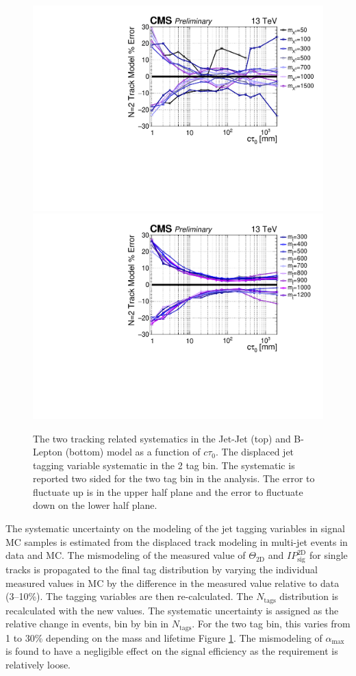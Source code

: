 \begin{figure}
\begin{center}
\includegraphics[width=.70\textwidth]{figures/an/SYSTEMATICS/76x_pu/sys_2tag_tracking.pdf}
\includegraphics[width=.70\textwidth]{figures/an/SYSTEMATICS/76x_pu/sys_2tag_tracking_dsusy.pdf}
\caption{The two tracking related systematics in the Jet-Jet (top) and B-Lepton
 (bottom)  model as a function of $c\tau_0$.  The displaced jet tagging variable 
systematic in the 2 tag bin. The systematic is reported two sided for the two tag
 bin in the analysis. The error to fluctuate up is in the upper half plane and the
 error to fluctuate down on the lower half plane.  \label{fig:offline_tracking_sys}}
\end{center}
\end{figure}

The systematic uncertainty on the modeling of the jet tagging
variables in signal MC samples is estimated from the displaced track
modeling in multi-jet events in data and MC. The mismodeling of the
measured value of $\Theta_{\textrm{2D}}$ and $IP_{\textrm{sig}}^{\textrm{2D}}$ for
single tracks is propagated to the final tag distribution by varying
the individual measured values in MC by the difference in the measured
value relative to data (3--10\%). The tagging variables are then
re-calculated.  The $N_{\textrm{tags}}$ distribution is recalculated
with the new values. The systematic uncertainty is assigned as the
relative change in events, bin by bin in $N_{\textrm{tags}}$. For the
two tag bin, this varies from 1 to 30\% depending on the mass and
lifetime Figure \ref{fig:offline_tracking_sys}. The mismodeling of
 $\alpha_{\textrm{max}}$ is found to have a negligible effect on the
 signal efficiency as the requirement is relatively loose.

